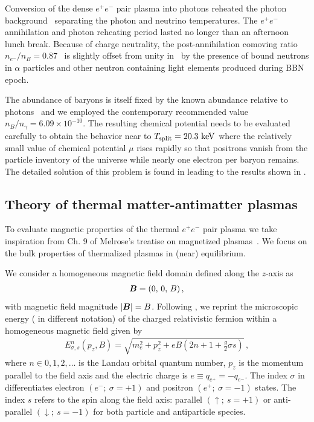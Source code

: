 Conversion of the dense $e^{+}e^{-}$ pair plasma into photons reheated the photon background~\cite{Birrell:2014uka} separating the photon and neutrino temperatures. The $e^{+}e^{-}$ annihilation and photon reheating period lasted no longer than an afternoon lunch break. Because of charge neutrality, the post-annihilation comoving ratio $n_{e^{-}}/n_{B}=0.87$~\cite{Rafelski:2023emw} is slightly offset from unity in~ by the presence of bound neutrons in $\alpha$ particles and other neutron containing light elements produced during BBN epoch.

The abundance of baryons is itself fixed by the known abundance relative to photons~\cite{ParticleDataGroup:2022pth} and we employed the contemporary recommended value $n_B/n_\gamma=6.09\times 10^{-10}$. The resulting chemical potential needs to be evaluated carefully to obtain the behavior near to $T_\mathrm{split}=20.3\text{ keV}$ where the relatively small value of chemical potential $\mu$ rises rapidly so that positrons vanish from the particle inventory of the universe while nearly one electron per baryon remains. The detailed solution of this problem is found in \cite{Fromerth:2012fe,Rafelski:2023emw} leading to the results shown in .

\subsection{Theory of thermal matter-antimatter plasmas}
\label{sec:theory}
\noindent To evaluate magnetic properties of the thermal $e^{+}e^{-}$ pair plasma we take inspiration from Ch. 9 of Melrose's treatise on magnetized plasmas~\cite{melrose2008quantum}. We focus on the bulk properties of thermalized plasmas in (near) equilibrium.

We consider a homogeneous magnetic field domain defined along the $z$-axis as
\begin{gather}
    \label{homoB:1}
    \boldsymbol{B}=(0,\,0,\,B)\,,
\end{gather}
with magnetic field magnitude $|\boldsymbol{B}|=B$. Following , we reprint the microscopic energy ( in different notation) of the charged relativistic fermion within a homogeneous magnetic field given by
\begin{align}
 \label{cosmokgp}
 E^{n}_{\sigma,s}(p_{z},{B})=\sqrt{m_{e}^{2}+p_{z}^{2}+e{B}\left(2n+1+\frac{g}{2}\sigma s\right)}\,,
\end{align}
where $n\in0,1,2,\ldots$ is the Landau orbital quantum number, $p_{z}$ is the momentum parallel to the field axis and the electric charge is $e\equiv q_{e^{+}}=-q_{e^{-}}$. The index $\sigma$ in  differentiates electron $(e^{-};\ \sigma=+1)$ and positron $(e^{+};\ \sigma=-1)$ states. The index $s$ refers to the spin along the field axis: parallel $(\uparrow;\ s=+1)$ or anti-parallel $(\downarrow;\ s=-1)$ for both particle and antiparticle species.

